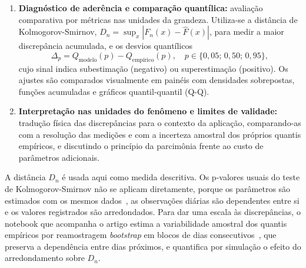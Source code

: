 \begin{enumerate}
    \item \textbf{Diagnóstico de aderência e comparação quantílica:} avaliação comparativa por métricas nas unidades da grandeza. Utiliza-se a distância de Kolmogorov-Smirnov, $D_n = \sup_x |F_n(x) - \widehat{F}(x)|$, para medir a maior discrepância acumulada, e os desvios quantílicos
    \begin{equation}
        \Delta_p = Q_{\text{modelo}}(p) - Q_{\text{empírico}}(p), \quad p \in \{0,05;\, 0,50;\, 0,95\},
        \label{eq:delta}
    \end{equation}
    cujo sinal indica subestimação (negativo) ou superestimação (positivo). Os ajustes são comparados visualmente em painéis com densidades sobrepostas, funções acumuladas e gráficos quantil-quantil (Q-Q).

    \item \textbf{Interpretação nas unidades do fenômeno e limites de validade:} tradução física das discrepâncias para o contexto da aplicação, comparando-as com a resolução das medições e com a incerteza amostral dos próprios quantis empíricos, e discutindo o princípio da parcimônia frente ao custo de parâmetros adicionais.
\end{enumerate}

A distância $D_n$ é usada aqui como medida descritiva. Os p-valores usuais do teste de Kolmogorov-Smirnov não se aplicam diretamente, porque os parâmetros são estimados com os mesmos dados~\cite{lilliefors1967}, as observações diárias são dependentes entre si e os valores registrados são arredondados. Para dar uma escala às discrepâncias, o notebook que acompanha o artigo estima a variabilidade amostral dos quantis empíricos por reamostragem \textit{bootstrap} em blocos de dias consecutivos~\cite{kunsch1989}, que preserva a dependência entre dias próximos, e quantifica por simulação o efeito do arredondamento sobre $D_n$.
